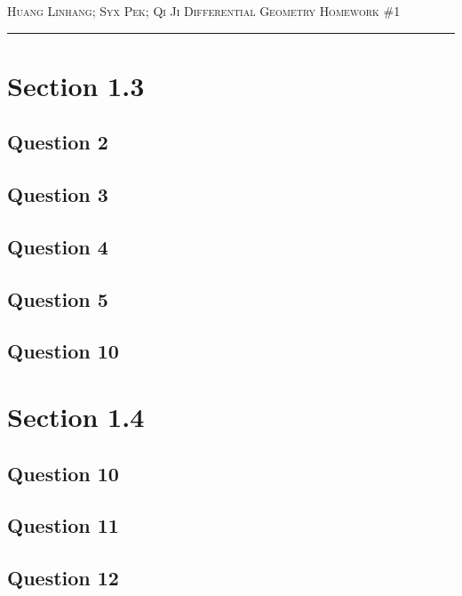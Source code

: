 \documentclass[12pt]{article}
\begin{document}
\thispagestyle{empty}

{\scshape Huang Linhang; Syx Pek; Qi Ji} \hfill {\scshape \large Differential Geometry} \hfill {\scshape Homework \#1}
 
\smallskip
\hrule
\bigskip

\section{Section 1.3}

\subsection*{Question 2}

\subsection*{Question 3}

\subsection*{Question 4}

\subsection*{Question 5}

\subsection*{Question 10}

\section{Section 1.4}

\subsection*{Question 10}

\subsection*{Question 11}

\subsection*{Question 12}
\end{document}
